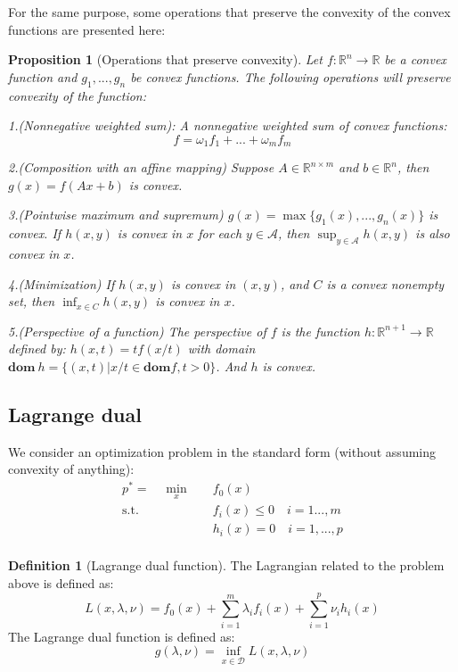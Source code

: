 \documentclass[
]{book}
\newtheorem{proposition}{Proposition}[chapter]
\theoremstyle{definition}
\newtheorem{definition}{Definition}[chapter]
\theoremstyle{definition}
\theoremstyle{definition}
\theoremstyle{definition}
\theoremstyle{remark}
\begin{document}
For the same purpose, some operations that preserve the convexity of the convex functions are presented here:

\begin{proposition}[Operations that preserve convexity]
\protect\hypertarget{prp:preservecvx}{}\label{prp:preservecvx}Let \(f:\mathbb{R}^n\to\mathbb{R}\) be a convex function and \(g_1,...,g_n\) be convex functions. The following operations will preserve convexity of the function:

1.(Nonnegative weighted sum): A nonnegative weighted sum of convex functions: \[f = \omega_1f_1 + ... +\omega_mf_m\]

2.(Composition with an affine mapping) Suppose \(A\in \mathbb{R}^{n\times m}\) and \(b\in \mathbb{R}^n\), then \(g(x) = f(Ax+b)\) is convex.

3.(Pointwise maximum and supremum) \(g(x) = \max\{g_1(x),...,g_n(x)\}\) is convex. If \(h(x,y)\) is convex in \(x\) for each \(y\in\mathcal{A}\), then \(\sup_{y\in\mathcal{A}} h(x,y)\) is also convex in \(x\).

4.(Minimization) If \(h(x,y)\) is convex in \((x,y)\), and \(C\) is a convex nonempty set, then \(\inf_{x\in C} h(x,y)\) is convex in \(x\).

5.(Perspective of a function) The perspective of \(f\) is the function \(h:\mathbb{R}^{n+1}\to\mathbb{R}\) defined by: \(h(x,t) = tf(x/t)\) with domain \(\textbf{dom}\ h=\{(x,t)|x/t\in\textbf{dom} f,t>0\}\). And \(h\) is convex.
\end{proposition}

\subsection{Lagrange dual}\label{lagrange-dual}

We consider an optimization problem in the standard form (without assuming convexity of anything):
\begin{equation}
\begin{aligned}
p^* = \quad \min_{x} \quad & f_0(x)\\
\textrm{s.t.} \quad & f_i(x)\leq 0\quad i=1...,m\\
  & h_i(x) = 0\quad i=1,...,p   \\
\end{aligned}
\end{equation}

\begin{definition}[Lagrange dual function]
\protect\hypertarget{def:defdualfunc}{}\label{def:defdualfunc}The Lagrangian related to the problem above is defined as: \[L(x,\lambda,\nu)=f_0(x)+\sum_{i=1}^m\lambda_if_i(x)+\sum_{i=1}^p\nu_ih_i(x)\]
The Lagrange dual function is defined as: \[g(\lambda,\nu) = \inf_{x\in\mathcal{D}}L(x,\lambda,\nu)\]
\end{definition}
\end{document}
